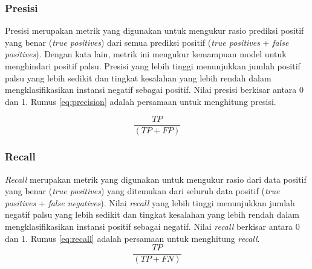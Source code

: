 \subsubsection{Presisi}
\label{subsubsec:precision}

Presisi merupakan metrik yang digunakan untuk mengukur rasio prediksi positif yang benar (\textit{true positives}) dari semua prediksi positif (\textit{true positives} + \textit{false positives}).
Dengan kata lain, metrik ini mengukur kemampuan model untuk menghindari positif palsu. Presisi yang lebih tinggi menunjukkan jumlah positif palsu yang lebih sedikit dan tingkat kesalahan yang lebih rendah dalam mengklasifikasikan instansi negatif sebagai positif.
Nilai presisi berkisar antara 0 dan 1. Rumus \ref{eq:precision} adalah persamaan untuk menghitung presisi.

\begin{equation}
  \label{eq:precision}
  \frac{TP}{(TP+FP)}
\end{equation}

\subsubsection{Recall}
\label{subsubsec:recall}

\textit{Recall} merupakan metrik yang digunakan untuk mengukur rasio dari data positif yang benar (\textit{true positives}) yang ditemukan dari seluruh data positif (\textit{true positives} + \textit{false negatives}).
Nilai \textit{recall} yang lebih tinggi menunjukkan jumlah negatif palsu yang lebih sedikit dan tingkat kesalahan yang lebih rendah dalam mengklasifikasikan instansi positif sebagai negatif.
Nilai \textit{recall} berkisar antara 0 dan 1. Rumus \ref{eq:recall} adalah persamaan untuk menghitung \textit{recall}.
\begin{equation}
  \label{eq:recall}
  \frac{TP}{(TP+FN)}
\end{equation}